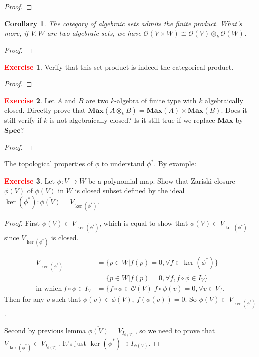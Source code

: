 \documentclass[12pt,a4paper,english]{article}
\theoremstyle{plain}
\newtheorem{coro}[thm]{Corollary}
\theoremstyle{definition}
\newtheorem{exercise}{\textbf{\textcolor{red}{Exercise}}}
\theoremstyle{remark}
\newcommand{\Max}{\mathbf{Max}}
\newcommand{\spec}{\mathbf{Spec}}
\begin{document}
\begin{proof}

\end{proof}
\begin{coro}
The category of algebraic sets admits the finite product. What's more, if $V,W$ are two algebraic sets, we have $\mathcal{O}(V\times W)\cong \mathcal{O}(V)\otimes_{k}\mathcal{O}(W)$.
\end{coro}
\begin{proof}

\end{proof}
\begin{exercise}
Verify that this set product is indeed the categorical product.
\end{exercise}
\begin{tcolorbox}
\begin{proof}

\end{proof}
\end{tcolorbox}
\begin{exercise}
Let $A$ and $B$ are two $k$-algebra of finite type with $k$ algebraically closed. Directly prove that $\Max(A\otimes_{k}B)=\Max(A)\times \Max(B)$. Does it still verify if $k$ is not algebraically closed? Is it still true if we replace $\Max$ by $\spec$?
\end{exercise}
\begin{tcolorbox}
\begin{proof}

\end{proof}
\end{tcolorbox}
The topological properties of $\phi$ to understand $\phi^{*}$. By example:
\begin{exercise}
Let $\phi:V\rightarrow W$ be a polynomial map. Show that Zariski closure $\overline{\phi(V)}$ of $\phi(V)$ in $W$ is closed subset defined by the ideal $\ker(\phi^{*}):\overline{\phi(V)}=V_{\ker(\phi^{*})}$.
\end{exercise}

\begin{tcolorbox}
\begin{proof}
First $\overline{\phi(V)}\subset V_{\ker(\phi^{*})}$, which is equal to show that $\phi(V)\subset V_{\ker(\phi^{*})}$ since $V_{\ker(\phi^{*})}$ is closed.

\begin{align*}
    V_{\ker(\phi^{*})}&=\{p\in W|f(p)=0, \forall f\in \ker(\phi^{*})\}\\
    &=\{p\in W|f(p)=0, \forall f, f\circ\phi\in I_{V}\}\\
    \text{in which}\  f\circ\phi\in I_{V}&=\{f\circ\phi\in\mathcal{O}(V)|f\circ\phi(v)=0, \forall v\in V\}.
\end{align*}
Then for any $v$ such that $\phi(v)\in \phi(V),\ f(\phi(v))=0$. So $\phi(V)\subset V_{\ker(\phi^{*})}$.

Second by previous lemma $\overline{\phi(V)}=V_{I_{\phi(V)}}$, so we need to prove that $V_{\ker(\phi^{*})}\subset V_{I_{\phi(V)}}$. It's just $\ker(\phi^{*})\supset I_{\phi(V)}$.
\end{proof}
\end{tcolorbox}
\end{document}
